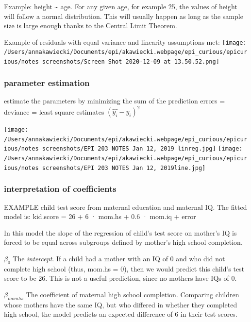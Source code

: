 \documentclass[
]{article}
\begin{document}
Example: height \textasciitilde{} age. For any given age, for example
25, the values of height will follow a normal distribution. This will
usually happen as long as the sample size is large enough thanks to the
Central Limit Theorem.

Example of residuals with equal variance and linearity assumptions met:
\texttt{[image: /Users/annakawiecki/Documents/epi/akawiecki.webpage/epi\_curious/epicurious/notes screenshots/Screen Shot 2020-12-09 at 13.50.52.png]}

\hypertarget{parameter-estimation}{%
\subsubsection{parameter estimation}\label{parameter-estimation}}

estimate the parameters \beta by minimizing the sum of the prediction
errors = deviance = least square estimates
\((\hat{y_i}- \hat{y_i})^{2}\)

\texttt{[image: /Users/annakawiecki/Documents/epi/akawiecki.webpage/epi\_curious/epicurious/notes screenshots/EPI 203 NOTES Jan 12, 2019 linreg.jpg]}
\texttt{[image: /Users/annakawiecki/Documents/epi/akawiecki.webpage/epi\_curious/epicurious/notes screenshots/EPI 203 NOTES Jan 12, 2019line.jpg]}

\hypertarget{interpretation-of-coefficients}{%
\subsubsection{interpretation of
coefficients}\label{interpretation-of-coefficients}}

EXAMPLE child test score from maternal education and maternal IQ. The
fitted model is: kid.score = 26 + 6 · mom.hs + 0.6 · mom.iq + error

In this model the slope of the regression of child's test score on
mother's IQ is forced to be equal across subgroups defined by mother's
high school completion,

\(\beta_0\) The \emph{intercept}. If a child had a mother with an IQ of
0 and who did not complete high school (thus, mom.hs = 0), then we would
predict this child's test score to be 26. This is not a useful
prediction, since no mothers have IQs of 0.

\(\beta_{momhs}\) The coefficient of maternal high school completion.
Comparing children whose mothers have the same IQ, but who differed in
whether they completed high school, the model predicts an expected
difference of 6 in their test scores.
\end{document}
